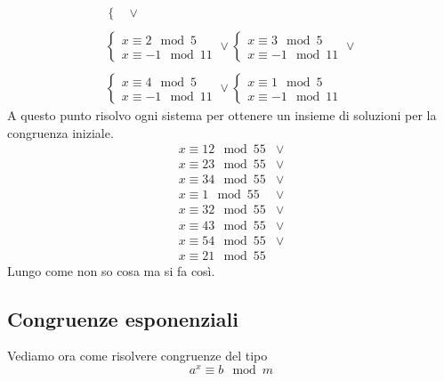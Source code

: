 \begin{example}
\begin{equation*}
\begin{array}{c}
\begin{cases}
			\end{cases} \vee  \\
			\\
			\begin{cases}
				x \equiv 2 \mod{5} \\
				x \equiv -1 \mod{11}
			\end{cases} \vee
			\begin{cases}
				x \equiv 3 \mod{5} \\
				x \equiv -1 \mod{11}
			\end{cases} \vee \\
			\\
			\begin{cases}
				x \equiv 4 \mod{5} \\
				x \equiv -1 \mod{11}
			\end{cases} \vee
			\begin{cases}
				x \equiv 1 \mod{5} \\
				x \equiv -1 \mod{11}
			\end{cases}
		\end{array}
	\end{equation*}
	A questo punto risolvo ogni sistema per ottenere un insieme di soluzioni per la congruenza
	iniziale.
	\begin{equation*}
		\begin{array}{cc}
			x \equiv 12 \mod{55} & \vee \\
			x \equiv 23 \mod{55} & \vee \\
			x \equiv 34 \mod{55} & \vee \\
			x \equiv 1 \mod{55}  & \vee \\
			x \equiv 32 \mod{55} & \vee \\
			x \equiv 43 \mod{55} & \vee \\
			x \equiv 54 \mod{55} & \vee \\
			x \equiv 21 \mod{55}
		\end{array}
	\end{equation*}
	Lungo come non so cosa ma si fa cos\`i.
\end{example}

\subsection{Congruenze esponenziali}
Vediamo ora come risolvere congruenze del tipo
\begin{equation*}
	a^x \equiv b \mod{m}
\end{equation*}

